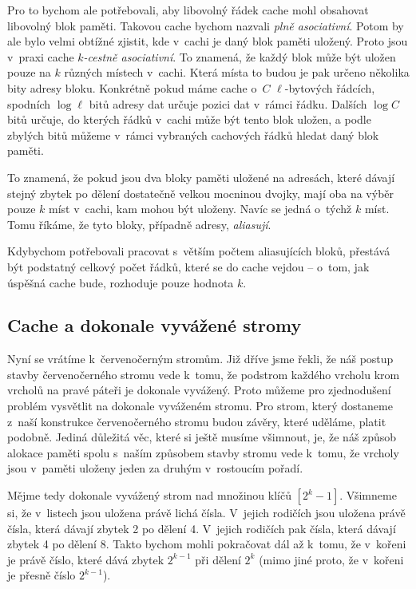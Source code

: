 Pro to bychom ale potřebovali, aby libovolný řádek cache mohl obsahovat
libovolný blok paměti. Takovou cache bychom nazvali \emph{plně asociativní}.
Potom by ale bylo velmi obtížné zjistit, kde v~cachi je daný blok paměti
uložený. Proto jsou v~praxi cache \emph{$k$-cestně asociativní}. To znamená, že
každý blok může být uložen pouze na $k$ různých místech v~cachi. Která místa to
budou je pak určeno několika bity adresy bloku. Konkrétně pokud máme
cache o~$C$ $\ell$-bytových řádcích, spodních $\log \ell$ bitů adresy dat určuje pozici dat v~rámci řádku. Dalších $\log C$ bitů určuje, do kterých řádků v~cachi může být tento blok uložen, a podle zbylých bitů můžeme v~rámci vybraných cachových řádků hledat daný blok paměti.

To znamená, že pokud jsou dva bloky paměti uložené na adresách, které dávají
stejný zbytek po dělení dostatečně velkou mocninou dvojky, mají oba na výběr
pouze $k$ míst v~cachi, kam mohou být uloženy. Navíc se jedná o~týchž $k$
míst. Tomu říkáme, že tyto bloky, případně adresy, \emph{aliasují}.

Kdybychom potřebovali pracovat s~větším počtem aliasujících bloků, přestává být
podstatný celkový počet řádků, které se do cache vejdou -- o~tom, jak úspěšná
cache bude, rozhoduje pouze hodnota $k$.

\subsection{Cache a dokonale vyvážené stromy}\label{sec:cache_and_balanced}

Nyní se vrátíme k~červenočerným stromům. Již dříve jsme řekli, že náš postup stavby červenočerného stromu vede k~tomu, že podstrom každého vrcholu krom vrcholů na pravé páteři je dokonale vyvážený. Proto můžeme pro zjednodušení problém vysvětlit na dokonale vyváženém stromu. Pro strom, který dostaneme z~naší konstrukce červenočerného stromu budou závěry, které uděláme, platit podobně. Jediná důležitá věc, které si ještě musíme všimnout, je, že náš způsob alokace paměti spolu s~naším způsobem stavby stromu vede k~tomu, že vrcholy jsou v~paměti uloženy jeden za druhým v~rostoucím pořadí.

Mějme tedy dokonale vyvážený strom nad množinou klíčů $[2^k-1]$. Všimneme si, že v~listech jsou uložena právě lichá čísla. V~jejich rodičích jsou uložena právě čísla, která dávají zbytek 2 po dělení 4. V~jejich rodičích pak čísla, která dávají zbytek 4 po dělení 8. Takto bychom mohli pokračovat dál až k~tomu, že v~kořeni je právě číslo, které dává zbytek $2^{k-1}$ při dělení $2^k$ (mimo jiné proto, že v~kořeni je přesně číslo $2^{k-1}$).

